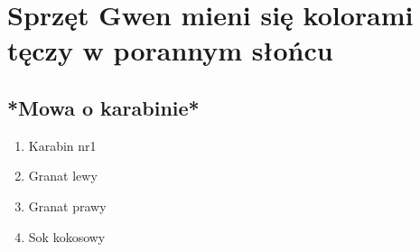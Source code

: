 \chapter{Sprzęt Gwen mieni się kolorami tęczy w porannym słońcu}
\section{*Mowa o karabinie*}

\begin{enumerate}
    \item Karabin nr1
    \item Granat lewy
    \item Granat prawy
    \item Sok kokosowy
\end{enumerate}